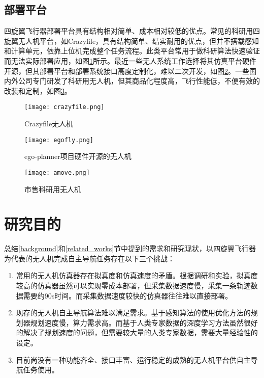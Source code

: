 \subsection{部署平台}
四旋翼飞行器部署平台具有结构相对简单、成本相对较低的优点。常见的科研用四旋翼无人机平台，如Crazyfile\cite{crazyfly}，具有结构简单、结实耐用的优点，但并不搭载感知和计算单元，依靠上位机完成整个任务流程。此类平台常用于做科研算法快速验证而无法实际部署应用，如图\ref{fig_crazyfile}所示。最近一些无人系统工作选择将其仿真平台硬件开源\cite{zhou2020ego}，但其部署平台和部署系统接口高度定制化，难以二次开发，如图\ref{fig_egofly}。一些国内外公司专门研发了科研用无人机\cite{amove}，但其商品化程度高，飞行性能低，不便有效的改装和定制，如图\ref{fig_amove}。
\begin{figure}
  \centering
    \texttt{[image: crazyfile.png]}
    \caption{Crazyfile无人机}
    \label{fig_crazyfile}
\end{figure}
\begin{figure}
  \centering
    \texttt{[image: egofly.png]}
    \caption{ego-planner项目硬件开源的无人机}
    \label{fig_egofly}
\end{figure}
\begin{figure}
  \centering
    \texttt{[image: amove.png]}
    \caption{市售科研用无人机}
    \label{fig_amove}
\end{figure}

\section{研究目的}
\label{target}
总结\ref{background}和\ref{related_works}节中提到的需求和研究现状，以四旋翼飞行器为代表的无人机完成自主导航任务存在以下三个挑战：
\begin{enumerate}
  \item 常用的无人机仿真器存在拟真度和仿真速度的矛盾。根据调研和实验，拟真度较高的仿真器虽然可以实现零成本部署，但采集数据速度慢，采集一条轨迹数据需要约90s时间\cite{loquercio2021learning}。而采集数据速度较快的仿真器往往难以直接部署\cite{zhu2022viola}。
  \item 现存的无人机自主导航算法难以满足需求。基于感知算法的使用优化方法的规划器规划速度慢，算力需求高\cite{ren2022bubble}。而基于人类专家数据的深度学习方法虽然很好的解决了规划速度的问题，但需要较大量的人类专家数据\cite{loquercio2021learning}，需要大量经验性的设定。
  \item 目前尚没有一种功能齐全、接口丰富、运行稳定的成熟的无人机平台供自主导航任务使用。
\end{enumerate}


